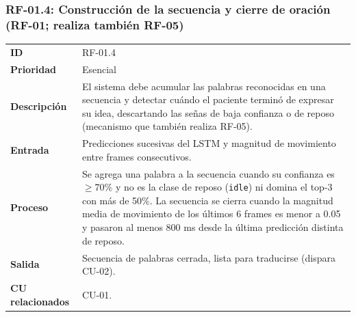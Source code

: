 \subsubsection{RF-01.4: Construcción de la secuencia y cierre de oración (RF-01; realiza también RF-05)}
\begin{table}[H]
\centering
\begin{tabularx}{\textwidth}{l X}
\toprule
\textbf{ID} & RF-01.4 \\
\textbf{Prioridad} & Esencial \\
\textbf{Descripción} & El sistema debe acumular las palabras reconocidas en una secuencia y detectar cuándo el paciente terminó de expresar su idea, descartando las señas de baja confianza o de reposo (mecanismo que también realiza RF-05). \\
\textbf{Entrada} & Predicciones sucesivas del LSTM y magnitud de movimiento entre frames consecutivos. \\
\textbf{Proceso} & Se agrega una palabra a la secuencia cuando su confianza es $\geq$70\% y no es la clase de reposo (\texttt{idle}) ni domina el top-3 con más de 50\%. La secuencia se cierra cuando la magnitud media de movimiento de los últimos 6 frames es menor a 0.05 y pasaron al menos 800 ms desde la última predicción distinta de reposo. \\
\textbf{Salida} & Secuencia de palabras cerrada, lista para traducirse (dispara CU-02). \\
\textbf{CU relacionados} & CU-01. \\
\bottomrule
\end{tabularx}
\end{table}


